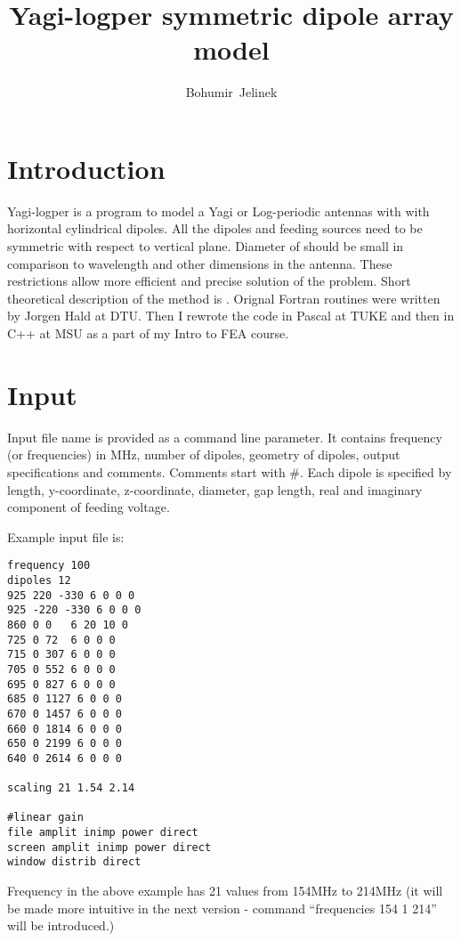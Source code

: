 \documentclass{article}
\author{Bohumir~Jelinek}
\title{Yagi-logper symmetric dipole array model}
\begin{document}
\maketitle
\tableofcontents

\section{Introduction}

Yagi-logper is a program to model a Yagi or Log-periodic antennas with
with horizontal cylindrical dipoles. All the dipoles and feeding
sources need to be symmetric with respect to vertical plane. Diameter
of should be small in comparison to wavelength and other dimensions in
the antenna. These restrictions allow more efficient and precise
solution of the problem. Short theoretical description of the method
is
.
Orignal Fortran routines were written by Jorgen Hald at DTU. Then I
rewrote the code in Pascal at TUKE and then in C++ at MSU as a part of
my Intro to FEA course.

\section{Input}

Input file name is provided as a command line parameter. It contains
frequency (or frequencies) in MHz, number of dipoles, geometry of
dipoles, output specifications and comments. Comments start with \#.
Each dipole is specified by length, y-coordinate, z-coordinate,
diameter, gap length, real and imaginary component of feeding voltage.

Example input file is:
\begin{verbatim}
frequency 100
dipoles 12
925 220 -330 6 0 0 0
925 -220 -330 6 0 0 0
860 0 0   6 20 10 0
725 0 72  6 0 0 0
715 0 307 6 0 0 0
705 0 552 6 0 0 0
695 0 827 6 0 0 0
685 0 1127 6 0 0 0
670 0 1457 6 0 0 0
660 0 1814 6 0 0 0
650 0 2199 6 0 0 0
640 0 2614 6 0 0 0

scaling 21 1.54 2.14

#linear gain
file amplit inimp power direct
screen amplit inimp power direct
window distrib direct
\end{verbatim}

Frequency in the above example has 21 values from 154MHz to 214MHz (it
will be made more intuitive in the next version - command
``frequencies 154 1 214'' will be introduced.)
\end{document}
